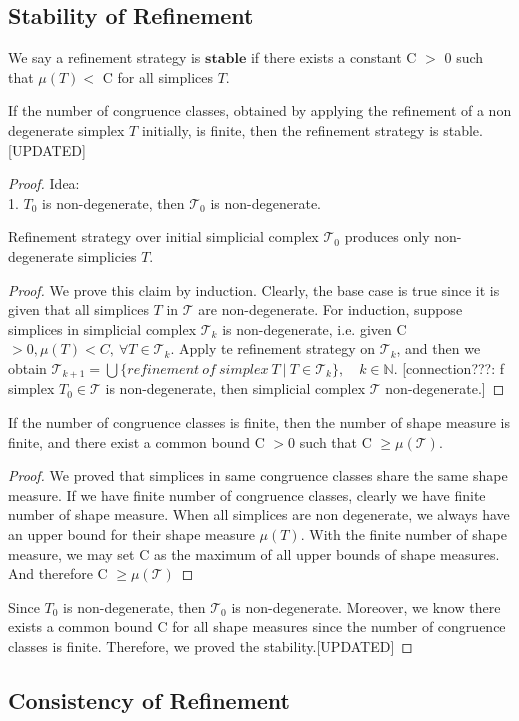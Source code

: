     \subsection{Stability of Refinement}
    \begin{definition*}
    We say a refinement strategy is $\textbf{stable}$ if there exists a constant C $>$ 0 such that $\mu(T)<$ C for all simplices $T$.
    \end{definition*}
    
    \begin{theorem*}
    If the number of congruence classes, obtained by applying the refinement of a non degenerate simplex $T$ initially, is finite, then the refinement strategy is stable.[UPDATED]
    \end{theorem*}
    \begin{proof}
    Idea:\\
    1. $T_0$ is non-degenerate, then $\mathcal{T_0}$ is non-degenerate.\\
    \begin{claim*}
    Refinement strategy over initial simplicial complex $\mathcal{T_0}$ produces only non-degenerate simplicies $T$.
    \begin{proof}
    We prove this claim by induction.
    Clearly, the base case is true since it is given that all simplices $T$ in $\mathcal{T}$ are non-degenerate. For induction, suppose simplices in simplicial complex $\mathcal{T}_k$ is non-degenerate, i.e. given C $> 0, \mu(T) < C, ~\forall T \in\mathcal{T}_k$. Apply te refinement strategy on $\mathcal{T}_k$, and then we obtain $\mathcal{T}_{k+1} = \bigcup\{refinement~of~simplex~T ~\vert ~T\in\mathcal{T}_{k}\}, \quad k\in\mathbb{N}$. [connection???: f simplex $T_0 \in\mathcal{T}$ is non-degenerate, then simplicial complex $\mathcal{T}$ non-degenerate.]
    \end{proof}
    \end{claim*}

    \begin{claim*}
    If the number of congruence classes is finite, then the number of shape measure is finite, and there exist a common bound C $> 0$ such that C $\geq \mu(\mathcal{T})$.
    \begin{proof}
    We proved that simplices in same congruence classes share the same shape measure. If we have finite number of congruence classes, clearly we have finite number of shape measure. When all simplices are non degenerate, we always have an upper bound for their shape measure $\mu(T)$. With the finite number of shape measure, we may set C as the maximum of all upper bounds of shape measures. And therefore C $\geq \mu(\mathcal{T})$
    \end{proof}
    \end{claim*}

    Since $T_0$ is non-degenerate, then $\mathcal{T_0}$ is non-degenerate. Moreover, we know there exists a common bound C for all shape measures since the number of congruence classes is finite. Therefore, we proved the stability.[UPDATED]
    \end{proof}
    
    
    \subsection{Consistency of Refinement}